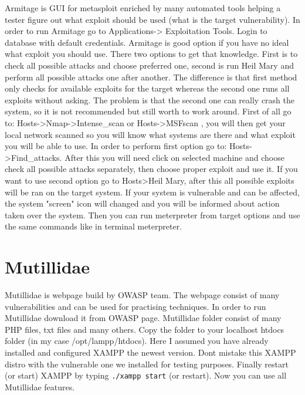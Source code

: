 \documentclass{article}[12pt]
\begin{document}
Armitage is GUI for metasploit enriched by many automated tools helping a tester figure out what exploit should be used (what is the target vulnerability). In order to run Armitage go to Applications-> Exploitation Tools.
Login to database with default credentials. Armitage is good option if you have no ideal what exploit you should use. There two options to get that knowledge. First is to check all possible attacks and choose preferred one, second is run Heil Mary and perform all possible attacks one after another. The difference is that first method
only checks for available exploits for the target whereas the second one runs all exploits without asking. The problem is that the second one can really crash the system, so it is not recommended but still worth to work around. First of all go to: Hosts->Nmap->Intense\_scan or Hosts->MSFscan
, you will then get your local network scanned so you will know what systems are there and what exploit you will be able to use. In order to perform first option go to: Hosts->Find\_attacks. After this you will need click on selected machine and choose check all possible attacks separately, then choose proper exploit and use it. If you want to use second option go to Hosts>Heil Mary, after this all possible exploits will be ran on the target system. If your system is
vulnerable and can be affected, the system "screen" icon will changed and you will be informed about action taken over the system. Then you can run meterpreter from target options and use the same commands like in terminal meterpreter.





\section{Mutillidae} Mutillidae is webpage build by OWASP team. The webpage consist of many vulnerabilities and can be used for practising techniques. In order to run Mutillidae download it from OWASP page. Mutillidae folder
consist of many PHP files, txt files and many others. Copy the folder to your localhost htdocs folder (in my case /opt/lampp/htdocs). Here I assumed you have already installed and configured XAMPP the newest version. Dont mistake this XAMPP distro with the vulnerable one we installed for testing purposes. Finally restart (or start) XAMPP by typing \texttt{./xampp start} (or restart).
Now you can use all Mutillidae features.
\end{document}
